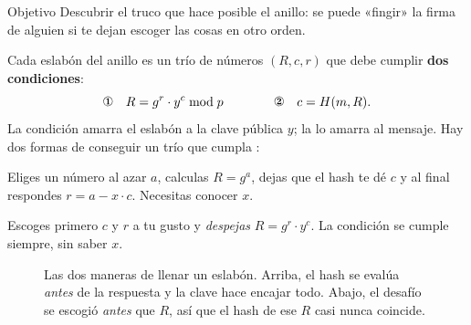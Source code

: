 \documentclass[11pt,a4paper]{article}
\theoremstyle{definition}
\theoremstyle{plain}
\theoremstyle{remark}
\begin{document}
\begin{nota}{Objetivo}
Descubrir el truco que hace posible el anillo: se puede «fingir» la firma de
alguien si te dejan escoger las cosas en otro orden.
\end{nota}

Cada eslabón del anillo es un trío de números $(R, c, r)$ que debe cumplir
\textbf{dos condiciones}:
\begin{equation}\label{eq:condiciones}
  \text{\ding{172}}\quad R = g^{r}\cdot y^{c} \bmod p
  \qquad\qquad
  \text{\ding{173}}\quad c = H(m, R).
\end{equation}
La condición  amarra el eslabón a la clave pública $y$; la  lo
amarra al mensaje. Hay dos formas de conseguir un trío que cumpla :

\begin{description}[leftmargin=1.4em,style=unboxed,itemsep=0.3em]
  \item[Con la clave secreta (orden natural).] Eliges un número al azar $a$,
    calculas $R = g^{a}$, dejas que el hash te dé $c$ y al final respondes
    $r = a - x\cdot c$. Necesitas conocer $x$.
  \item[Sin la clave (simulación, orden invertido).] Escoges primero $c$ y $r$ a tu
    gusto y \emph{despejas} $R = g^{r}\cdot y^{c}$. La condición  se cumple
    siempre, sin saber $x$.
\end{description}

\begin{figure}[htbp]
\centering
{}
\caption{Las dos maneras de llenar un eslabón. Arriba, el hash se evalúa
\emph{antes} de la respuesta y la clave hace encajar todo. Abajo, el desafío se
escogió \emph{antes} que $R$, así que el hash de ese $R$ casi nunca coincide.}
\label{fig:dosordenes}
\end{figure}
\end{document}
